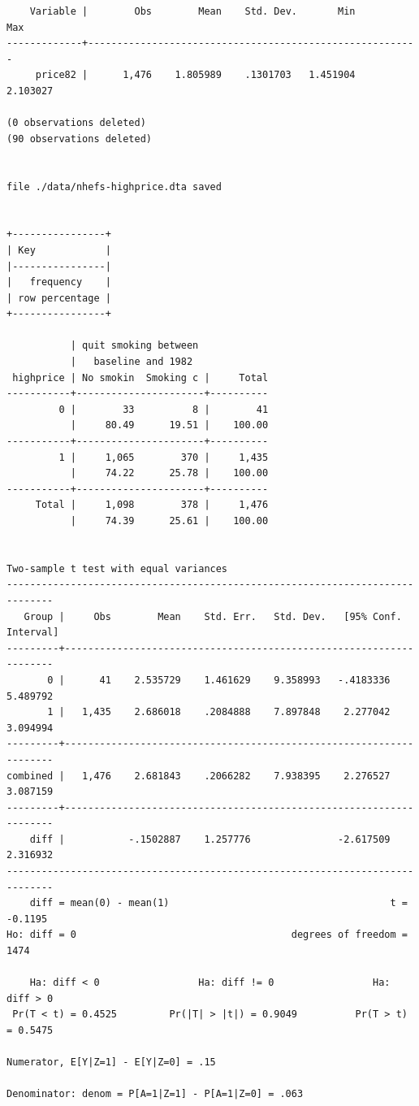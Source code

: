 \documentclass[
  10pt,
]{book}
\begin{document}
\begin{verbatim}
    Variable |        Obs        Mean    Std. Dev.       Min        Max
-------------+---------------------------------------------------------
     price82 |      1,476    1.805989    .1301703   1.451904   2.103027

(0 observations deleted)
(90 observations deleted)


file ./data/nhefs-highprice.dta saved


+----------------+
| Key            |
|----------------|
|   frequency    |
| row percentage |
+----------------+

           | quit smoking between
           |   baseline and 1982
 highprice | No smokin  Smoking c |     Total
-----------+----------------------+----------
         0 |        33          8 |        41 
           |     80.49      19.51 |    100.00 
-----------+----------------------+----------
         1 |     1,065        370 |     1,435 
           |     74.22      25.78 |    100.00 
-----------+----------------------+----------
     Total |     1,098        378 |     1,476 
           |     74.39      25.61 |    100.00 


Two-sample t test with equal variances
------------------------------------------------------------------------------
   Group |     Obs        Mean    Std. Err.   Std. Dev.   [95% Conf. Interval]
---------+--------------------------------------------------------------------
       0 |      41    2.535729    1.461629    9.358993   -.4183336    5.489792
       1 |   1,435    2.686018    .2084888    7.897848    2.277042    3.094994
---------+--------------------------------------------------------------------
combined |   1,476    2.681843    .2066282    7.938395    2.276527    3.087159
---------+--------------------------------------------------------------------
    diff |           -.1502887    1.257776               -2.617509    2.316932
------------------------------------------------------------------------------
    diff = mean(0) - mean(1)                                      t =  -0.1195
Ho: diff = 0                                     degrees of freedom =     1474

    Ha: diff < 0                 Ha: diff != 0                 Ha: diff > 0
 Pr(T < t) = 0.4525         Pr(|T| > |t|) = 0.9049          Pr(T > t) = 0.5475

Numerator, E[Y|Z=1] - E[Y|Z=0] = .15

Denominator: denom = P[A=1|Z=1] - P[A=1|Z=0] = .063


\end{verbatim}
\end{document}
